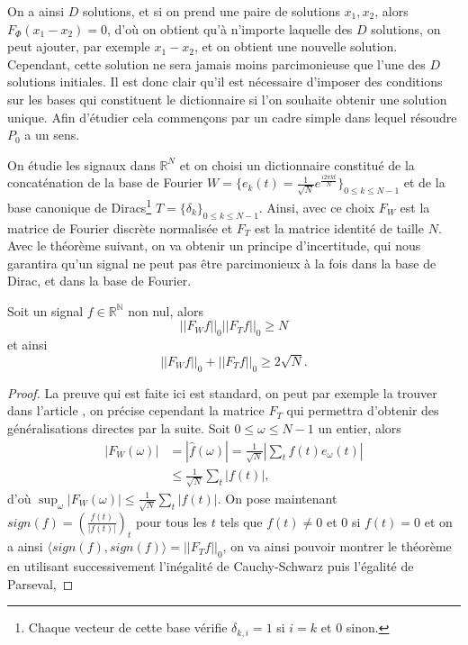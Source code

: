 On a ainsi $D$ solutions, et si on prend une paire de solutions $x_1, x_2$, alors $F_\Phi(x_1 - x_2) = 0$, d'où on obtient qu'à n'importe laquelle des $D$ solutions, on peut ajouter, par exemple $x_1 - x_2$, et on obtient une nouvelle solution. 
Cependant, cette solution ne sera jamais moins parcimonieuse que l'une des $D$ solutions initiales.
Il est donc clair qu'il est nécessaire d'imposer des conditions sur les bases qui constituent le dictionnaire si l'on souhaite obtenir une solution unique.
Afin d'étudier cela commençons par un cadre simple dans lequel résoudre $P_0$ a un sens.
\begin{exemple}
	On étudie les signaux dans $\mathbb{R}^N$ et on choisi un dictionnaire constitué de la concaténation de la base de Fourier $ W = \{e_k(t) = \frac{1}{\sqrt{N}} e^{\frac{i 2\pi k t}{N}}\}_{0 \leq k \leq N -1}$ et de la base canonique de Diracs\footnote{Chaque vecteur de cette base vérifie $\delta_{k,i} = 1$ si $i = k$ et 0 sinon.} $T = \{\delta_k\}_{0 \leq k \leq N-1}$.
	Ainsi, avec ce choix $F_W$ est la matrice de Fourier discrète normalisée et $F_T$ est la matrice identité de taille $N$.
	Avec le théorème suivant, on va obtenir un principe d'incertitude, qui nous garantira qu'un signal ne peut pas être parcimonieux à la fois dans la base de Dirac, et dans la base de Fourier.
	\begin{theoreme}\label{th:Incert1}
		Soit un signal $f\in \mathbb{R^N}$ non nul, alors
		\begin{equation}
			||F_W f||_0 ||F_T f||_0 \geq N 	
		\end{equation}
		et ainsi
		\begin{equation}
			||F_W f||_0 + ||F_T f||_0 \geq 2 \sqrt{N}. 	
		\end{equation}
	\end{theoreme}
	\begin{proof}
		La preuve qui est faite ici est standard, on peut par exemple la trouver dans l'article \cite{taoprime}, on précise cependant la matrice $F_T$ qui permettra d'obtenir des généralisations directes par la suite.
		Soit $0 \leq \omega \leq N-1$ un entier, alors 
		\begin{align}
			|F_W(\omega)| &= |\hat{f}(\omega)| = \frac{1}{\sqrt{N}}|\sum_t f(t)e_\omega(t)| \\
				&\leq \frac{1}{\sqrt{N}}\sum_t |f(t)|,
		\end{align}
		d'où $\sup_\omega |F_W(\omega)| \leq \frac{1}{\sqrt{N}} \sum_t |f(t)|$.
		On pose maintenant $sign(f) = (\frac{f(t)}{|f(t)|})_t$ pour tous les $t$ tels que $f(t) \neq 0$ et 0 si $f(t) = 0$ et on a ainsi $\langle sign(f), sign(f) \rangle = ||F_T f||_0$, on va ainsi pouvoir montrer le théorème en utilisant successivement l'inégalité de Cauchy-Schwarz puis l'égalité de Parseval,

\end{proof}
\end{exemple}
